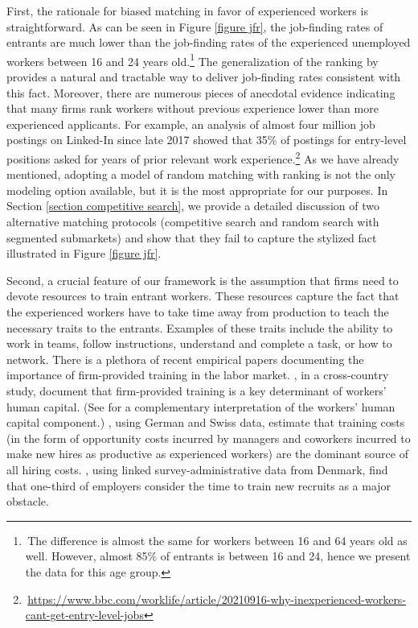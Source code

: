 \documentclass[12pt]{article} %
\theoremstyle{definition}
\begin{document}
First, the rationale for biased matching in favor of experienced workers is straightforward.
As can be seen in Figure \ref{figure jfr}, the job-finding rates of entrants are much lower than the job-finding rates of the experienced unemployed workers between 16 and 24 years old.\footnote{\,The difference is almost the same for workers between 16 and 64 years old as well. However, almost 85\% of entrants is between 16 and 24, hence we present the data for this age group.} 
The generalization of the \cite{blanchard1994ranking} ranking by \cite{petrongolo2001looking} provides a natural and tractable way to deliver job-finding rates consistent with this fact. 
Moreover, there are numerous pieces of anecdotal evidence indicating that many firms rank workers without previous experience lower than more experienced applicants.
For example, an analysis of almost four million job postings on Linked-In since late 2017 showed that 35\% of postings for entry-level positions asked for years of prior relevant work experience.\footnote{\,\scriptsize{\url{https://www.bbc.com/worklife/article/20210916-why-inexperienced-workers-cant-get-entry-level-jobs}}}
As we have already mentioned, adopting a model of random matching with ranking is not the only modeling option available, but it is the most appropriate for our purposes.
In Section \ref{section competitive search}, we provide a detailed discussion of two alternative matching protocols (competitive search and random search with segmented submarkets) and show that they fail to capture the stylized fact illustrated in Figure \ref{figure jfr}. 

Second, a crucial feature of our framework is the assumption that firms need to devote resources to train entrant workers.
These resources capture the fact that the experienced workers have to take time away from production to teach the necessary traits to the entrants. 
Examples of these traits include the ability to work in teams, follow instructions, understand and complete a task, or how to network.
There is a plethora of recent empirical papers documenting the importance of firm-provided training in the labor market.
\cite{ma2022human}, in a cross-country study, document that firm-provided training is a key determinant of workers' human capital. (See \cite{herkenhoff2024production} for a complementary interpretation of the workers' human capital component.)
\cite{faccini2022importance}, using German and Swiss data, estimate that training costs (in the form of opportunity costs incurred by managers and coworkers incurred to make new hires as productive as experienced workers) are the dominant source of all hiring costs.
\cite{bertheau2023makes}, using linked survey-administrative data from Denmark, find that one-third of employers consider the time to train new recruits as a major obstacle.
\end{document}
